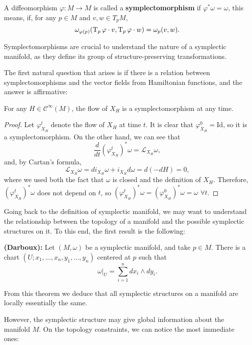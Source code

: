 \begin{deff}
A diffeomorphism $\varphi : M \rightarrow M$ is called a {\bf symplectomorphism} if $\varphi^{\ast} \omega = \omega$, this means, if, for any $p \in M$ and $v, w \in T_pM$,
\[\omega_{\varphi(p)}(\operatorname T_p \varphi \cdot v, \operatorname T_p \varphi \cdot w) = \omega_p(v,w) .\]
\end{deff}

Symplectomorphisms are crucial to understand the nature of a symplectic manifold, as they define its group of structure-preserving transformations.

The first natural question that arises is if there is a relation between symplectomorphisms and the vector fields from Hamiltonian functions, and the answer is affirmative:

\begin{prop}
For any $H \in \mathcal{C}^{\infty}(M)$, the flow of $X_H$ is a symplectomorphism at any time.
\end{prop}

\begin{proof}
Let $\varphi_{X_H}^t$ denote the flow of $X_H$ at time $t$. It is clear that $\varphi_{X_H}^0 = \text{Id}$, so it is a symplectomorphism. On the other hand, we can see that
\[\frac{d}{d t} (\varphi_{X_H}^t)^{\ast} \omega = \mathcal{L}_{X_H} \omega ,\]
and, by Cartan's formula,
\[\mathcal{L}_{X_H} \omega = d i_{X_H} \omega + i_{X_H} d \omega = d (- d H) = 0 ,\]
where we used both the fact that $\omega$ is closed and the definition of $X_H$. Therefore, $(\varphi_{X_H}^t)^{\ast} \omega$ does not depend on $t$, so $(\varphi_{X_H}^t)^{\ast} \omega = (\varphi_{X_H}^0)^{\ast} \omega = \omega$ $\forall t$.
\end{proof}

Going back to the definition of symplectic manifold, we may want to understand the relationship between the topology of a manifold and the possible symplectic structures on it. To this end, the first result is the following:

\begin{theo}
{\bf (Darboux):} Let $(M,\omega)$ be a symplectic manifold, and take $p \in M$. There is a chart $(U;x_1,...,x_n,y_1,...,y_n)$ centered at $p$ such that
\[\left. \omega \right|_U = \sum_{i=1}^n d x_i \wedge d y_i .\]
\end{theo}

From this theorem we deduce that all symplectic structures on a manifold are locally essentially the same.

However, the symplectic structure may give global information about the manifold $M$. On the topology constraints, we can notice the most immediate ones:

